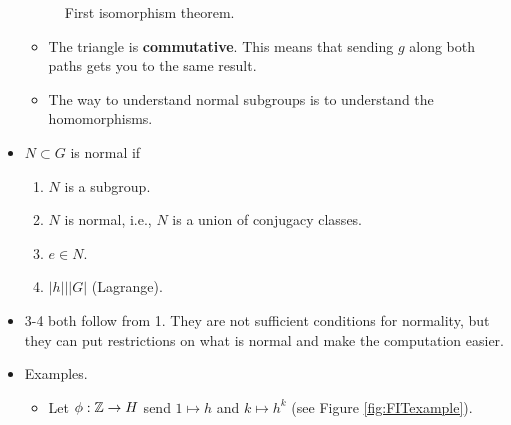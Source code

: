 \documentclass[../notes.tex]{subfiles}
\begin{document}
\begin{itemize}
\begin{figure}[h!]
        \caption{First isomorphism theorem.}
        \label{fig:isoTrm1}
    \end{figure}
    \begin{itemize}
        \item The triangle is \textbf{commutative}. This means that sending $g$ along both paths gets you to the same result.
        \item The way to understand normal subgroups is to understand the homomorphisms.
    \end{itemize}
    \item $N\subset G$ is normal if
    \begin{enumerate}
        \item $N$ is a subgroup.
        \item $N$ is normal, i.e., $N$ is a union of conjugacy classes.
        \item $e\in N$.
        \item $|h|\big||G|$ (Lagrange).
    \end{enumerate}
    \item 3-4 both follow from 1. They are not sufficient conditions for normality, but they can put restrictions on what is normal and make the computation easier.
    \item Examples.
    \begin{itemize}
        \item Let $\phi:\mathbb{Z}\to H$ send $1\mapsto h$ and $k\mapsto h^k$ (see Figure \ref{fig:FITexample}).
        \begin{figure}[h!]
            \centering
\end{figure}
\end{itemize}
\end{itemize}
\end{document}
